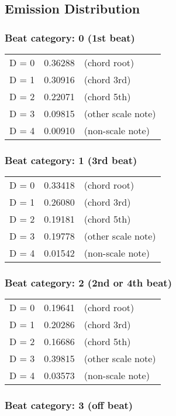 \subsection{Emission Distribution}

\subsubsection*{Beat category: 0 (1st beat)}


\begin{tabular}{l l l}
D = 0 & 0.36288 & (chord root)\\
D = 1 & 0.30916 & (chord 3rd)\\
D = 2 & 0.22071 & (chord 5th)\\
D = 3 & 0.09815 & (other scale note)\\
D = 4 & 0.00910 & (non-scale note)\\
\end{tabular}


\subsubsection*{Beat category: 1 (3rd beat)}


\begin{tabular}{l l l}
D = 0 & 0.33418 & (chord root)\\
D = 1 & 0.26080 & (chord 3rd)\\
D = 2 & 0.19181 & (chord 5th)\\
D = 3 & 0.19778 & (other scale note)\\
D = 4 & 0.01542 & (non-scale note)\\
\end{tabular}


\subsubsection*{Beat category: 2 (2nd or 4th beat)}


\begin{tabular}{l l l}
D = 0 & 0.19641 & (chord root)\\
D = 1 & 0.20286 & (chord 3rd)\\
D = 2 & 0.16686 & (chord 5th)\\
D = 3 & 0.39815 & (other scale note)\\
D = 4 & 0.03573 & (non-scale note)\\
\end{tabular}


\subsubsection*{Beat category: 3 (off beat)}


